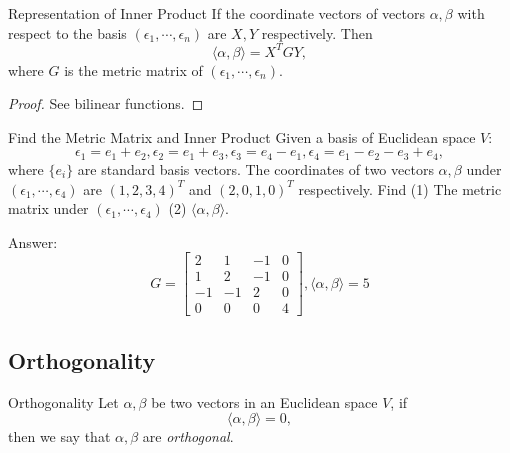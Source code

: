 \begin{proposition}{Representation of Inner Product}{}
  If the coordinate vectors of vectors $\alpha, \beta$ with respect to the basis
  $(\epsilon_1,\cdots,\epsilon_n)$ are $X, Y$ respectively.
  Then 
  \begin{equation}
    \langle \alpha, \beta \rangle = X^TGY,
  \end{equation}
  where $G$ is the metric matrix of $(\epsilon_1,\cdots,\epsilon_n)$.
\end{proposition}

\begin{proof}
  See bilinear functions.
\end{proof}

\begin{example}{Find the Metric Matrix and Inner Product}{}
  Given a basis of Euclidean space $V$:
  \begin{equation}
    \epsilon_1=e_1+e_2,\epsilon_2=e_1+e_3,\epsilon_3=e_4-e_1,\epsilon_4=e_1-e_2-e_3+e_4,
  \end{equation}
  where $\{e_i\}$ are standard basis vectors.
  The coordinates of two vectors $\alpha, \beta$ under
  $(\epsilon_1,\cdots,\epsilon_4)$ are $(1,2,3,4)^T$ and $(2,0,1,0)^T$ respectively.
  Find (1) The metric matrix under $(\epsilon_1,\cdots,\epsilon_4)$
  (2) $\langle \alpha, \beta \rangle$.
\end{example}

\begin{solution}
  Answer:
  \begin{equation}
    G=\begin{bmatrix}2&1&-1&0\\1&2&-1&0\\-1&-1&2&0\\0&0&0&4\end{bmatrix},\langle \alpha,\beta \rangle=5
  \end{equation}
\end{solution}

\subsection{Orthogonality}

\begin{definition}{Orthogonality}{}
  Let $\alpha, \beta$ be two vectors in an Euclidean space $V$,
  if
  \begin{equation}
    \langle \alpha, \beta \rangle = 0,
  \end{equation}
  then we say that $\alpha, \beta$ are \emph{orthogonal}.
\end{definition}

